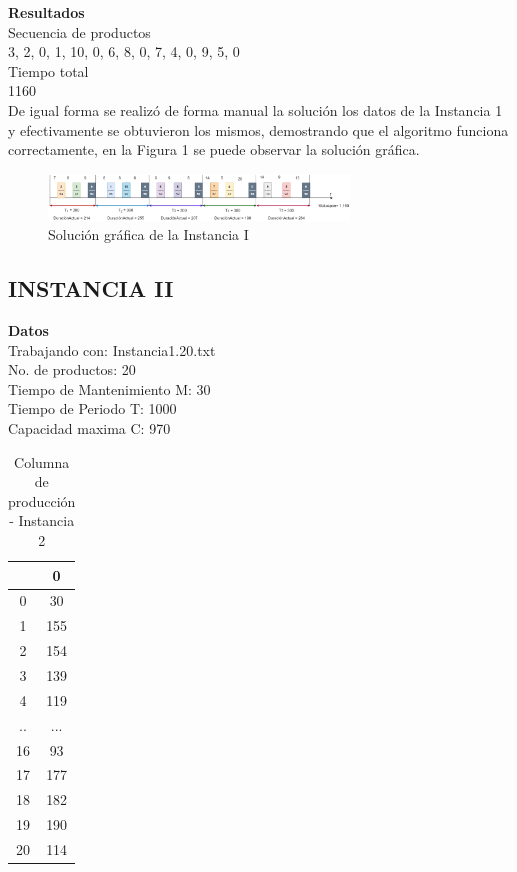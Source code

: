 \documentclass[twocolumn,10pt]{article}
\begin{document}
\textbf{Resultados}\\
Secuencia de productos\\
3, 2, 0, 1, 10, 0, 6, 8, 0, 7, 4, 0, 9, 5, 0\\
Tiempo total\\
1160\\
De igual forma se realizó de forma manual la solución los datos de la Instancia 1 y efectivamente se obtuvieron los mismos, demostrando que el algoritmo funciona correctamente, en la Figura 1 se puede observar la solución gráfica.


\begin{figure}[!htb]
	\centering
	\includegraphics[width=8cm]{Figuras/Imagen1.png}
      \caption{Solución gráfica de la Instancia I}
      \label{fig:Instancia1_Fig}
\end{figure}







\subsection{INSTANCIA II}


\textbf{Datos}\\
Trabajando con:  Instancia1.20.txt\\
No. de productos: 20\\
Tiempo de Mantenimiento M: 30\\
Tiempo de Periodo T: 1000\\
Capacidad maxima C: 970\\



\begin{table}[h]
\centering
\begin{tabular}{||c c||} 
 \hline
  &0 \\
\hline
   
0   & 30\\
1  & 155\\
2  & 154\\
3  & 139\\
4  & 119\\
..  &...\\
16 &  93\\
17 & 177\\
18&  182\\
19&  190\\
20 & 114\\
\hline

\end{tabular}
\caption{Columna de producción - Instancia 2}
\label{table:1}
\end{table}
\end{document}
